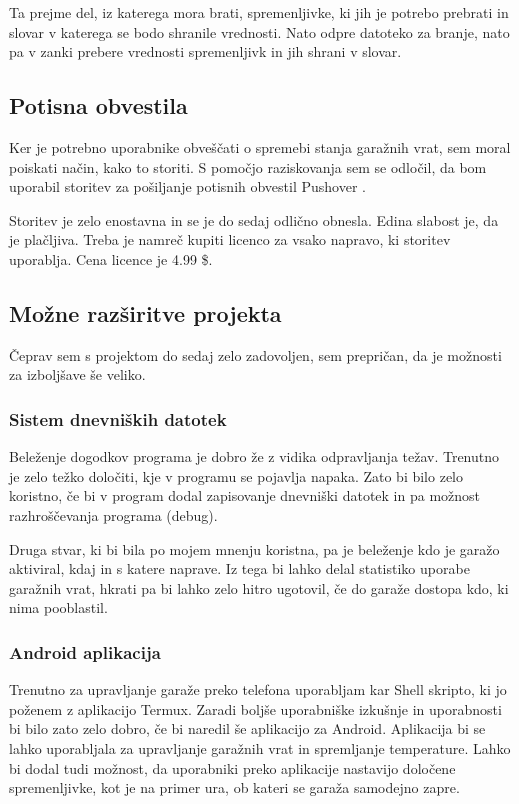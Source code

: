 \documentclass[11pt]{article}
\begin{document}
Ta prejme del, iz katerega mora brati, spremenljivke, ki jih je potrebo prebrati in slovar v katerega se bodo shranile vrednosti. Nato odpre datoteko za branje, nato pa v zanki prebere vrednosti spremenljivk in jih shrani v slovar.

\subsection{Potisna obvestila}
Ker je potrebno uporabnike obveščati o spremebi stanja garažnih vrat, sem moral poiskati način, kako to storiti. S pomočjo raziskovanja sem se odločil, da bom uporabil storitev za pošiljanje potisnih obvestil Pushover \cite{Pushover}.

Storitev je zelo enostavna in se je do sedaj odlično obnesla. Edina slabost je, da je plačljiva. Treba je namreč kupiti licenco za vsako napravo, ki storitev uporablja. Cena licence je 4.99 \$.
\subsection{Možne razširitve projekta}
Čeprav sem s projektom do sedaj zelo zadovoljen, sem prepričan, da je možnosti za izboljšave še veliko.
\subsubsection{Sistem dnevniških datotek}
Beleženje dogodkov programa je dobro že z vidika odpravljanja težav. Trenutno je zelo težko določiti, kje v programu se pojavlja napaka. Zato bi bilo zelo koristno, če bi v program dodal zapisovanje dnevniški datotek in pa možnost razhroščevanja programa (debug).

Druga stvar, ki bi bila po mojem mnenju koristna, pa je beleženje kdo je garažo aktiviral, kdaj in s katere naprave. Iz tega bi lahko delal statistiko uporabe garažnih vrat, hkrati pa bi lahko zelo hitro ugotovil, če do garaže dostopa kdo, ki nima pooblastil.
\subsubsection{Android aplikacija}
Trenutno za upravljanje garaže preko telefona uporabljam kar Shell skripto, ki jo poženem z aplikacijo Termux. Zaradi boljše uporabniške izkušnje in uporabnosti bi bilo zato zelo dobro, če bi naredil še aplikacijo za Android. Aplikacija bi se lahko uporabljala za upravljanje garažnih vrat in spremljanje temperature. Lahko bi dodal tudi možnost, da uporabniki preko aplikacije nastavijo določene spremenljivke, kot je na primer ura, ob kateri se garaža samodejno zapre.
\end{document}
